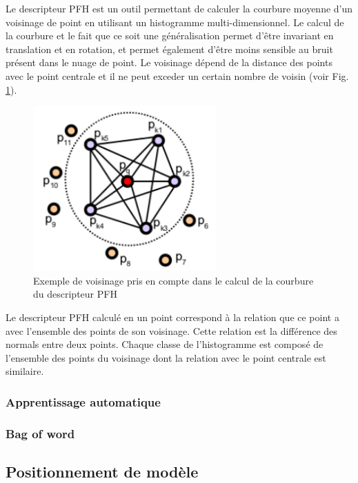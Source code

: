 Le descripteur PFH\cite{PFH} est un outil permettant de calculer la courbure moyenne d'un voisinage de point en utilisant
un histogramme multi-dimensionnel. Le calcul de la courbure et le fait que ce soit une généralisation permet d'être invariant 
en translation et en rotation, et permet également d'être moins sensible au bruit présent dans le nuage de point. Le voisinage 
dépend de la distance des points avec le point centrale et il ne peut exceder un certain nombre de voisin (voir Fig. \ref{fig:pfhNeighborhood}).
\begin{figure}[!h]
  \begin{center}
    \includegraphics[width=7cm]{image/PFH.png}
    \caption{Exemple de voisinage pris en compte dans le calcul de la courbure du descripteur PFH}
    \label{fig:pfhNeighborhood}
  \end{center}
\end{figure}
Le descripteur PFH calculé en un point correspond à la relation que ce point a avec l'ensemble des points de son voisinage. Cette relation
est la différence des normals entre deux points. Chaque classe de l'histogramme est composé de l'ensemble des points du voisinage dont 
la relation avec le point centrale est similaire.
\subsubsection{Apprentissage automatique}
\subsubsection{Bag of word}

\subsection{Positionnement de modèle}
